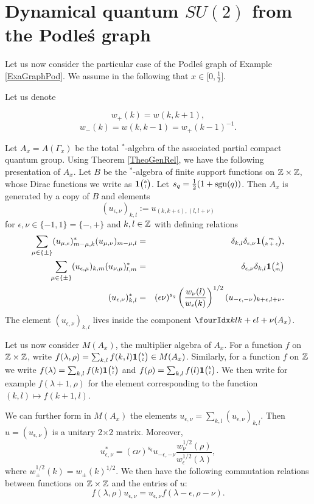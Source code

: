 
\section{Dynamical quantum $SU(2)$ from the Podle\'{s} graph}

Let us now consider the particular case of the Podle\'{s} graph of Example \ref{ExaGraphPod}. We assume in the following that $x\in \lbrack 0,\frac{1}{2}\rbrack$.

Let us denote

\[w_+(k) = w(k,k+1),\]\[w_-(k)  = w(k,k-1) = w_+(k-1)^{-1}.\] 

Let $A_x = A(\Gamma_x)$ be the total $^*$-algebra of the associated partial compact quantum group. Using Theorem \ref{TheoGenRel}, we have the following presentation of $A_x$. Let $B$ be the $^*$-algebra of finite support functions on $\mathbb{Z}\times \mathbb{Z}$, whose Dirac functions we write as $\mathbf{1}{\tiny {\begin{pmatrix} k\\l\end{pmatrix}}}$. Let $s_q = \frac{1}{2}(1+\operatorname{\mathrm{sgn}}(q))$. Then $A_x$ is generated by a copy of $B$ and elements \[(u_{\epsilon,\nu})_{k,l} := u_{(k,k+\epsilon),(l,l+\nu)}\] for $\epsilon,\nu\in \{-1,1\}=\{-,+\}$ and $k,l\in \mathbb{Z}$ with defining relations \begin{eqnarray*} \sum_{\mu\in \{\pm\}} (u_{\mu,\epsilon})_{m-\mu,k}^* (u_{\mu,\nu})_{m-\mu,l}&=& \delta_{k,l} \delta_{\epsilon,\nu} \mathbf{1}{\tiny {\begin{pmatrix} m\\k+\epsilon\end{pmatrix}}},\\ \sum_{\mu\in \{\pm\}} (u_{\epsilon,\mu})_{k,m} (u_{\nu,\mu})_{l,m}^* &=& \delta_{\epsilon,\nu}\delta_{k,l} \mathbf{1}{\tiny {\begin{pmatrix} k\\m\end{pmatrix}}}\\ (u_{\epsilon,\nu})_{k,l}^* &=& (\epsilon\nu)^{s_q} \left(\frac{w_{\nu}(l)}{w_{\epsilon}(k)}\right)^{1/2} (u_{-\epsilon,-\nu})_{k+\epsilon,l+\nu}.\end{eqnarray*} The element $(u_{\epsilon,\nu})_{k,l}$ lives inside the component $\Gr{(A_x)}{k}{k+\epsilon}{l}{l+\nu}$.

Let us now consider $M(A_x)$, the multiplier algebra of $A_x$. For a function $f$ on $\mathbb{Z}\times \mathbb{Z}$, write $f(\lambda,\rho) = \sum_{k,l} f(k,l)\mathbf{1}{\tiny {\begin{pmatrix} k\\l\end{pmatrix}}} \in M(A_x)$. Similarly, for a function $f$ on $\mathbb{Z}$ we write $f(\lambda) = \sum_{k,l} f(k)\mathbf{1}{\tiny {\begin{pmatrix} k\\l\end{pmatrix}}}$ and $f(\rho) = \sum_{k,l}f(l)\mathbf{1}{\tiny {\begin{pmatrix} k\\l\end{pmatrix}}}$. We then write for example $f(\lambda+1,\rho)$ for the element corresponding to the function $(k,l)\mapsto f(k+1,l)$.

We can further form in $M(A_x)$ the elements $u_{\epsilon,\nu} = \sum_{k,l} (u_{\epsilon,\nu})_{k,l}$. Then $u=(u_{\epsilon,\nu})$ is a unitary 2$\times$2 matrix. Moreover, \begin{equation}\label{EqAdju}u_{\epsilon,\nu}^* = (\epsilon\nu)^{s_q} u_{-\epsilon,-\nu}\frac{w_{\nu}^{1/2}(\rho)}{w_{\epsilon}^{1/2}(\lambda)} ,\end{equation} where $w_{\pm}^{1/2}(k) = w_{\pm}(k)^{1/2}$.  We then have the following commutation relations between functions on $\mathbb{Z}\times \mathbb{Z}$ and the entries of $u$: \begin{equation}\label{EqGradu} f(\lambda,\rho)u_{\epsilon,\nu} = u_{\epsilon,\nu}f(\lambda-\epsilon,\rho-\nu).\end{equation}

